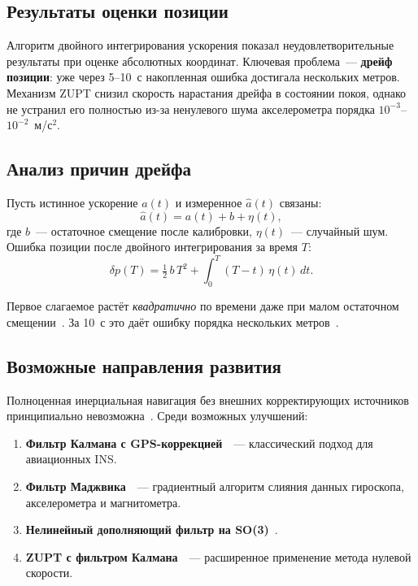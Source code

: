 \documentclass[../main.tex]{subfiles}
\begin{document}
\subsection{Результаты оценки позиции}
 
Алгоритм двойного интегрирования ускорения показал неудовлетворительные
результаты при оценке абсолютных координат. Ключевая проблема~---
\textbf{дрейф позиции}: уже через 5--10~с накопленная ошибка достигала
нескольких метров. Механизм ZUPT снизил скорость нарастания дрейфа в
состоянии покоя, однако не устранил его полностью из-за ненулевого шума
акселерометра порядка $10^{-3}$--$10^{-2}$~м/с$^2$.
 
\subsection{Анализ причин дрейфа}
 
Пусть истинное ускорение $a(t)$ и измеренное $\hat{a}(t)$ связаны:
\begin{equation}
    \hat{a}(t) = a(t) + b + \eta(t),
    \label{eq:noise}
\end{equation}
где $b$~--- остаточное смещение после калибровки, $\eta(t)$~--- случайный
шум. Ошибка позиции после двойного интегрирования за время $T$:
\begin{equation}
    \delta p(T) = \tfrac{1}{2}\,b\,T^2 +
    \int_0^T\!(T-t)\,\eta(t)\,dt.
    \label{eq:drift}
\end{equation}
 
Первое слагаемое растёт \textit{квадратично} по времени даже при малом
остаточном смещении~\cite{groves2013}. За 10~с это даёт ошибку порядка
нескольких метров~\cite{woodman2007}.
 
\subsection{Возможные направления развития}
 
Полноценная инерциальная навигация без внешних корректирующих источников
принципиально невозможна~\cite{groves2013}. Среди возможных улучшений:
\begin{enumerate}[leftmargin=2cm]
    \item \textbf{Фильтр Калмана с GPS-коррекцией}~\cite{groves2013}~---
          классический подход для авиационных INS.
    \item \textbf{Фильтр Маджвика}~\cite{madgwick2011}~--- градиентный
          алгоритм слияния данных гироскопа, акселерометра и магнитометра.
    \item \textbf{Нелинейный дополняющий фильтр на SO(3)}~\cite{mahony2008}.
    \item \textbf{ZUPT с фильтром Калмана}~\cite{skog2010}~---
          расширенное применение метода нулевой скорости.
\end{enumerate}
 
\newpage
	
\end{document}
